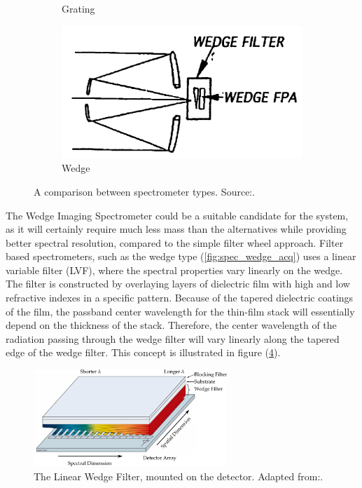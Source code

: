 \begin{figure}[H]
\begin{subfigure}[b]{0.3\textwidth}
        \caption{Grating}\label{fig:spec_grating}
    \end{subfigure}
    \begin{subfigure}[b]{0.3\textwidth}
        \includegraphics[width=\textwidth]{figures/Orbiter/spectrometer_wedge.png}
        \caption{Wedge}\label{fig:spec_wedge}
    \end{subfigure}
    \caption{A comparison between spectrometer types. Source:\cite{puschell1999a}.}\label{fig:spec_compare}
\end{figure}
The Wedge Imaging Spectrometer could be a suitable candidate for the system, as it will certainly require much less mass than the alternatives while providing better spectral resolution, compared to the simple filter wheel approach. Filter based spectrometers, such as the wedge type (\ref{fig:spec_wedge_acq}) uses a linear variable filter (LVF), where the spectral properties vary linearly on the wedge\cite{joseph2015building}. The filter is constructed by overlaying layers of dielectric film with high and low refractive indexes in a specific pattern. Because of the tapered dielectric coatings of the film, the passband center wavelength for the thin-film stack will essentially depend on the thickness of the stack. Therefore, the center wavelength of the radiation passing through the wedge filter will vary linearly along the tapered edge of the wedge filter\cite{joseph2015building}. This concept is illustrated in figure (\ref{fig:spec_wedge2}).
\begin{figure}[H]
\centering
\includegraphics[width=0.65\textwidth]{figures/Orbiter/spectrometer_wedge_3}
\caption{The Linear Wedge Filter, mounted on the detector. Adapted from:\cite{puschell1999a}.}
\label{fig:spec_wedge2}
\end{figure}
